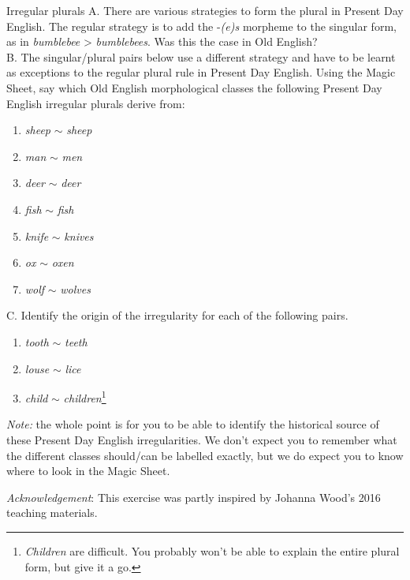 \begin{exercises}{Irregular plurals}\label{exercise-OE-plurals}
A. \newline
\noindent There are various strategies to form the plural in Present Day English. The regular strategy is to add the -\emph{(e)s} morpheme to the singular form, as in \emph{bumblebee} > \emph{bumblebees}. Was this the case in Old English?\\

\noindent B. \newline
\noindent The singular/plural pairs below use a different strategy and have to be learnt as exceptions to the regular plural rule in Present Day English. Using the Magic Sheet, say which Old English morphological classes the following Present Day English irregular plurals derive from:

\begin{enumerate}
  \item \textit{sheep} $\sim$ \textit{sheep}
  \item \textit{man} $\sim$ \textit{men}
  \item \textit{deer} $\sim$ \textit{deer}
  \item \textit{fish} $\sim$ \textit{fish}
  \item \textit{knife} $\sim$ \textit{knives}
  \item \textit{ox} $\sim$ \textit{oxen}
  \item \textit{wolf} $\sim$ \textit{wolves}
\end{enumerate}

\noindent C. \newline
\noindent Identify the origin of the irregularity for each of the following pairs.

\begin{enumerate}
  \item \textit{tooth} $\sim$ \textit{teeth}
  \item \textit{louse} $\sim$ \textit{lice}
  \item \textit{child} $\sim$ \textit{children}\footnote{\textit{Children} are difficult. You probably won't be able to explain the entire plural form, but give it a go.}
\end{enumerate}

\noindent \emph{Note:} the whole point is for you to be able to identify the historical source of these Present Day English irregularities. We don't expect you to remember what the different classes should/can be labelled exactly, but we do expect you to know where to look in the Magic Sheet.

\noindent \emph{Acknowledgement}: This exercise was partly inspired by Johanna Wood's 2016 teaching materials.

\end{exercises}


